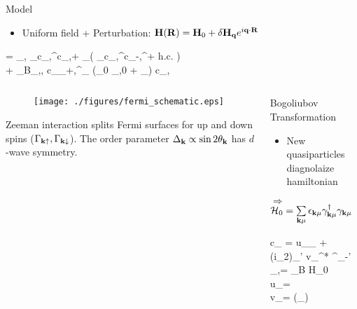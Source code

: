 \documentclass{beamer} %
\begin{document}
\begin{frame}{}
\begin{columns}[t]
\begin{column}{.4\textwidth}
\begin{block}{\centering\veryHuge Model}
\begin{itemize}
			\item{Uniform field + Perturbation: ${\bf H}({\bf R}) = {\bf H}_0 + \delta {\bf H}_{\bf q} e^{i{\bf q} \cdot {\bf R}}$}	
			\end{itemize}
			\begin{framed}		
				\bea
				\cH = \sum_{\vk,\mu} \xi_\vk c_{\vk,\mu}^\dag c_{\vk,\mu}\nonumber  + \sum_\vk \left( \Delta_\vk c_{\vk,\uparrow}^\dag c_{-\vk,\downarrow}^\dag + h.c. \right)\nonumber \\+ \mu_B\sum_{\vk,\mu,\nu} c_{\vk_+\vq,\mu}^\dag  \vsigma_{\mu\nu} (\vH_0 \delta_{\vq,0} + \delta\vH_\vq) c_{\vk,\nu}  
				\nonumber 
				\eea
			\end{framed}
				\begin{columns}[t]
				\begin{column}{0.47\linewidth}
					\begin{framed}
					\begin{figure}
					\texttt{[image: ./figures/fermi\_schematic.eps]}
					\end{figure}
					Zeeman interaction splits Fermi surfaces for up and down spins ($\Gamma_{{\bf k} \uparrow}, \Gamma_{{\bf k} \downarrow}$). 
					The order parameter $\Delta_{\bf k} \propto \sin 2\theta_{\bf k} $ has $d$-wave symmetry. 
					\end{framed}
				\end{column}
				\begin{column}{0.51\textwidth}
					\begin{center}{\LARGE Bogoliubov Transformation}\end{center}
					\begin{itemize}
					\item{New quasiparticles diagnolaize hamiltonian}
					\end{itemize}
					\begin{framed}
					{\LARGE $\Rightarrow$${\cal H}_0 = \sum\limits_{{\bf k} \mu} \epsilon_{{\bf k} \mu} \gamma^\dag_{{\bf k} \mu} \gamma_{{\bf k} \mu} $}
					\end{framed}
					{\small
					\bea
					c_{\vk \mu} = u_\vk \gamma_{\vk \mu} + (i\sigma_2)_{\mu\mu'} v_\vk^* \gamma^\dag_{-\vk \mu'}\\
					\epsilon_{\vk,\mu}= \pm \mu_B H_0 \\
					u_{\vk}=\sqrt{\frac{1}{2}\left( 1+\frac{\xi_{\vk}}{\sqrt{\Delta_{\vk}^2+\xi_{\vk}^2}} \right)} \\
					v_{\vk}= \sgn(\Delta_\vk) \sqrt{\frac{1}{2}\left( 1-\frac{\xi_{\vk}}{\sqrt{\Delta_{\vk}^2+\xi_{\vk}^2}} \right)}
					\eea
					}
				\end{column}
			\end{columns}
		\end{block}
		

\end{column}
\end{columns}
\end{frame}
\end{document}
